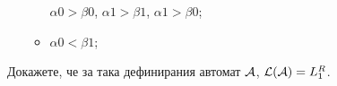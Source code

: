 \begin{hint}
\begin{itemize}
\begin{itemize}
      $\alpha 0 > \beta 0$, $\alpha 1 > \beta 1$, $\alpha 1 > \beta 0$;
    \item
      $\alpha 0 < \beta 1$;
    \end{itemize}
  \end{itemize}
  Докажете, че за така дефинирания автомат $\mathcal{A}$, $\mathcal{L}(\mathcal{A}) = L^R_1$.
\end{hint}
\fi

